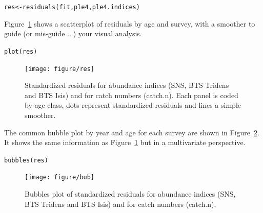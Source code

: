 \documentclass[a4paper,english,10pt]{article}\usepackage[]{graphicx}\usepackage[]{color}
\makeatletter
\newcommand{\hlstd}[1]{\textcolor[rgb]{0,0,0}{#1}}%
\newcommand{\hlkwb}[1]{\textcolor[rgb]{0.361,0.506,0.596}{#1}}%
\newcommand{\hlkwd}[1]{\textcolor[rgb]{0.361,0.506,0.596}{#1}}%
\newenvironment{kframe}{%
 \def\at@end@of@kframe{}%
 \ifinner\ifhmode%
  \def\at@end@of@kframe{\end{minipage}}%
  \begin{minipage}{\columnwidth}%
 \fi\fi%
 \def\FrameCommand##1{\hskip\@totalleftmargin \hskip-\fboxsep
 \colorbox{shadecolor}{##1}\hskip-\fboxsep
     \hskip-\linewidth \hskip-\@totalleftmargin \hskip\columnwidth}%
 \MakeFramed {\advance\hsize-\width
   \@totalleftmargin\z@ \linewidth\hsize
   \@setminipage}}%
 {\par\unskip\endMakeFramed%
 \at@end@of@kframe}
\newenvironment{knitrout}{}{} %
\makeatother
\begin{document}
\begin{knitrout}
\color{fgcolor}\begin{kframe}
\begin{alltt}
\hlstd{res} \hlkwb{<-} \hlkwd{residuals}\hlstd{(fit, ple4, ple4.indices)}
\end{alltt}
\end{kframe}
\end{knitrout}

Figure~\ref{fig:res} shows a scatterplot of residuals by age and survey, with a smoother to guide (or mis-guide ...) your visual analysis.

\begin{knitrout}
\color{fgcolor}\begin{kframe}
\begin{alltt}
\hlkwd{plot}\hlstd{(res)}
\end{alltt}
\end{kframe}\begin{figure}[H]


{\centering \texttt{[image: figure/res]} 

}

\caption[Standardized residuals for abundance indices (SNS, BTS Tridens and BTS Isis) and for catch numbers (catch]{Standardized residuals for abundance indices (SNS, BTS Tridens and BTS Isis) and for catch numbers (catch.n). Each panel is coded by age class, dots represent standardized residuals and lines a simple smoother.\label{fig:res}}
\end{figure}


\end{knitrout}

The common bubble plot by year and age for each survey are shown in Figure~\ref{fig:bub}. It shows the same information as Figure~\ref{fig:res} but in a multivariate perspective.

\begin{knitrout}
\color{fgcolor}\begin{kframe}
\begin{alltt}
\hlkwd{bubbles}\hlstd{(res)}
\end{alltt}
\end{kframe}\begin{figure}[H]


{\centering \texttt{[image: figure/bub]} 

}

\caption[Bubbles plot of standardized residuals for abundance indices (SNS, BTS Tridens and BTS Isis) and for catch numbers (catch]{Bubbles plot of standardized residuals for abundance indices (SNS, BTS Tridens and BTS Isis) and for catch numbers (catch.n).\label{fig:bub}}
\end{figure}


\end{knitrout}
\end{document}
